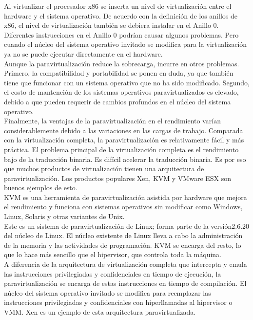 Al virtualizar el procesador x86 se inserta un nivel de virtualización entre el hardware y el sistema operativo. De acuerdo con la definición de los anillos de x86, el nivel de virtualización también se debiera instalar en el Anillo 0. Diferentes instrucciones en el Anillo 0 podrían causar algunos problemas. Pero cuando el núcleo del sistema operativo invitado se modifica para la virtualización ya no se puede ejecutar directamente en el hardware.\\

Aunque la paravirtualización reduce la sobrecarga, incurre en otros problemas. Primero, la compatibilidad y portabilidad se ponen en duda, ya que también tiene que funcionar con un sistema operativo que no ha sido modificado. Segundo, el costo de mantención de los sistemas operativos paravirtualizados es elevado, debido a que pueden requerir de cambios profundos en el núcleo del sistema operativo.\\

Finalmente, la ventajas de la paravirtualización en el rendimiento varían considerablemente debido a las variaciones en las cargas de trabajo. Comparada con la virtualización completa, la paravirtualización es relativamente fácil y más práctica. El problema principal de la virtualización completa es el rendimiento bajo de la traducción binaria. Es difícil acelerar la traducción binaria. Es por eso que muchos productos de virtualización tienen una arquitectura de paravirtualización. Los productos populares Xen, KVM y VMware ESX son buenos ejemplos de esto.\\

KVM es una herramienta de paravirtualización asistida por hardware que mejora el rendimiento y funciona con sistemas operativos sin modificar como Windows, Linux, Solaris y otras variantes de Unix.\\

Este es un sistema de paravirtualización de Linux; forma parte de la versión2.6.20 del núcleo de Linux. El núcleo existente de Linux lleva a cabo la administración de la memoria y las actividades de programación. KVM se encarga del resto, lo que lo hace más sencillo que el hipervisor, que controla toda la máquina.\\

A diferencia de la arquitectura de virtualización completa que intercepta y emula las instrucciones privilegiadas y confidenciales en tiempo de ejecución, la paravirtualización se encarga de estas instrucciones en tiempo de compilación. El núcleo del sistema operativo invitado se modifica para reemplazar las instrucciones privilegiadas y confidenciales con hiperllamadas al hipervisor o VMM. Xen es un ejemplo de esta arquitectura paravirtualizada.\\

